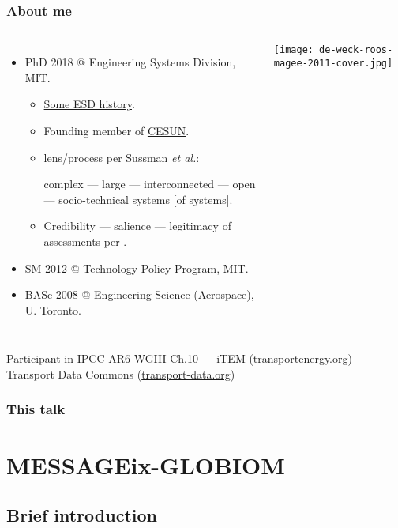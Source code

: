 \documentclass[12pt,aspectratio=169]{beamer}
\begin{document}
\begin{frame}
\frametitle{About me}

\begin{columns}[T]

\begin{itemize}
  \item PhD 2018 @ Engineering Systems Division, MIT.

  \begin{itemize}
    \item \href{https://web.mit.edu/fnl/volume/284/deweck.html}{Some ESD history}.
    \item Founding member of \href{https://cesun.org/about}{CESUN}.
    \item {} lens/process per Sussman \emph{et al.}:

    complex — large — interconnected — open — socio-technical systems [of systems].
    \item Credibility — salience — legitimacy of assessments per \cite{cash-2003}.
  \end{itemize}
  \item SM 2012 @ Technology Policy Program, MIT.
  \item BASc 2008 @ Engineering Science (Aerospace), U. Toronto.
\end{itemize}
\texttt{[image: de-weck-roos-magee-2011-cover.jpg]}
\end{columns}

\smallskip
Participant in \href{https://www.ipcc.ch/report/ar6/wg3/chapter/chapter-10/}{IPCC AR6 WGIII Ch.10} — iTEM (\href{https://transportenergy.org}{transportenergy.org}) — Transport Data Commons (\href{https://transport-data.org}{transport-data.org})
\end{frame}

\begin{frame}
\frametitle{This talk}

\tableofcontents

\end{frame}

\section{MESSAGEix-GLOBIOM}

\subsection{Brief introduction}
\end{document}
